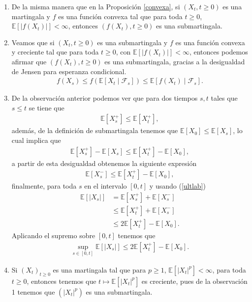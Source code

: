 \begin{enumerate}
	\item De la misma manera que en la Proposición \ref{convexa}, si $(X_t, t \geq 0)$ es una martingala y $f$ es una función convexa tal que para toda $t \geq 0$, $\mathbb{E}[|f(X_t)|] < \infty$, entonces $(f(X_t), t \geq 0)$ es una submartingala. \\
    
    \item Veamos que si $(X_t, t \geq 0)$ es una submartingala y $f$ es una función convexa y creciente tal que para toda $t \geq 0$, con $\mathbb{E}[|f(X_t)|] < \infty$, entonces podemos afirmar que $(f(X_t), t \geq 0)$ es una submartingala, gracias a la desigualdad de Jensen para esperanza condicional.
    \begin{align*}
		f(X_s) \leq f \left( \mathbb{E} [X_t \mid \mathcal{F}_s] \right) \leq \mathbb{E} [f(X_t) \mid \mathcal{F}_s].
	\end{align*}
    
    \item De la observación anterior podemos ver que para dos tiempos $s, t$ tales que $s \leq t$ se tiene que
    \begin{align*}
		\mathbb{E} [X_s^{+}] \leq \mathbb{E} [X_t^{+}],
	\end{align*}
    además, de la definición de submartingala tenemos que $\mathbb{E}[X_0] \leq \mathbb{E}[X_s ]$, lo cual implica que
    \begin{align*}
		\mathbb{E} [X_s^{+}] - \mathbb{E} [X_s] \leq \mathbb{E} [X_t^{+}] - \mathbb{E} [X_0],
	\end{align*}
a partir de esta desigualdad obtenemos la siguiente expresión
    \begin{align}
		\mathbb{E} [X_s^{-}] \leq \mathbb{E} [X_t^{+}] - \mathbb{E} [X_0], \label{ultlab}
	\end{align}
finalmente, para toda $s$ en el intervalo $[0,t]$ y usando (\ref{ultlab})
    \begin{align*}
		\mathbb{E} [|X_s|] & =  \mathbb{E} [X_s^{+}] + \mathbb{E} [X_s^{-}] \\ 
        & \leq \mathbb{E} [X_t^{+}] + \mathbb{E} [X_s^{-}] \\
        & \leq 2 \mathbb{E} [X_t^{+}] - \mathbb{E} [X_0].
	\end{align*}
Aplicando el supremo sobre $[0, t]$ tenemos que
    \begin{align*}
		\sup_{s \in [0, t]} \mathbb{E} [|X_s|] \leq 2 \mathbb{E} [X_t^{+}] - \mathbb{E} [X_0].
	\end{align*}
    
    \item Si $(X_t)_{t \geq 0}$ es una martingala tal que para $p \geq 1$, $\mathbb{E}[|X_t|^p] < \infty$, para toda $t \geq 0$, entonces tenemos que $ t \mapsto \mathbb{E}[|X_t|^p]$ es creciente, pues de la observación 1 tenemos que $(|X_t|^p)$ es una submartingala.
\end{enumerate}

